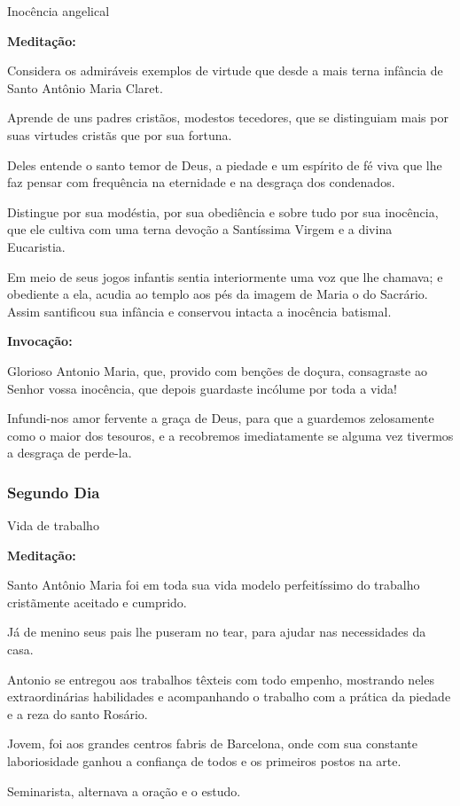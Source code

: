 \documentclass[a4paper,14pt]{extarticle} \usepackage[utf8]{inputenc}
\begin{document}
Inocência angelical

\textbf{Meditação:}

Considera os admiráveis exemplos de virtude que desde a mais terna infância de Santo Antônio Maria Claret.

Aprende de uns padres cristãos, modestos tecedores, que se distinguiam mais por suas virtudes cristãs que por sua fortuna.

Deles entende o santo temor de Deus, a piedade e um espírito de fé viva que lhe faz pensar com frequência na eternidade e na desgraça dos condenados.

Distingue por sua modéstia, por sua obediência e sobre tudo por sua inocência, que ele cultiva com uma terna devoção a Santíssima Virgem e a divina Eucaristia.

Em meio de seus jogos infantis sentia interiormente uma voz que lhe chamava; e obediente a ela, acudia ao templo aos pés da imagem de Maria o do Sacrário. Assim santificou sua infância e conservou intacta a inocência batismal.

\textbf{Invocação:}

 Glorioso Antonio Maria, que, provido com benções de doçura, consagraste ao Senhor vossa inocência, que depois guardaste incólume por toda a vida!

Infundi-nos amor fervente a graça de Deus, para que a guardemos zelosamente como o maior dos tesouros, e a recobremos imediatamente se alguma vez tivermos a desgraça de perde-la.

\subsubsection{Segundo Dia}
Vida de trabalho

\textbf{Meditação:}

Santo Antônio Maria foi em toda sua vida modelo perfeitíssimo do trabalho cristãmente aceitado e cumprido.

Já de menino seus pais lhe puseram no tear, para ajudar nas necessidades da casa.

Antonio se entregou aos trabalhos têxteis com todo empenho, mostrando neles extraordinárias habilidades e acompanhando o trabalho com a prática da piedade e a reza do santo Rosário.

Jovem, foi aos grandes centros fabris de Barcelona, onde com sua constante laboriosidade ganhou a confiança de todos e os primeiros postos na arte.

Seminarista, alternava a oração e o estudo.
\end{document}
